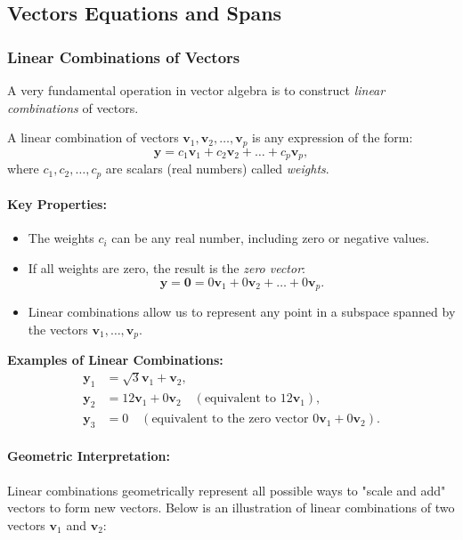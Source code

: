 \documentclass[a4paper,12pt]{article}
\begin{document}
\subsection{Vectors Equations and Spans}


\subsubsection{Linear Combinations of Vectors}

A very fundamental operation in vector algebra is to construct \textit{linear combinations} of vectors. 
\begin{tcolorbox}[title=Definition,colframe=blue!70!black, colback=blue!5!white]
A linear combination of vectors \(\mathbf{v}_1, \mathbf{v}_2, \dots, \mathbf{v}_p\) is any expression of the form:
\[
\mathbf{y} = c_1 \mathbf{v}_1 + c_2 \mathbf{v}_2 + \dots + c_p \mathbf{v}_p,
\]
where \(c_1, c_2, \dots, c_p\) are scalars (real numbers) called \textit{weights}.\\
\end{tcolorbox}
\paragraph{Key Properties:}
\begin{itemize}
    \item The weights \(c_i\) can be any real number, including zero or negative values.
    \item If all weights are zero, the result is the \textit{zero vector}: 
    \[
    \mathbf{y} = \mathbf{0} = 0 \mathbf{v}_1 + 0 \mathbf{v}_2 + \dots + 0 \mathbf{v}_p.
    \]
    \item Linear combinations allow us to represent any point in a subspace spanned by the vectors \(\mathbf{v}_1, \dots, \mathbf{v}_p\).
\end{itemize}

\textbf{Examples of Linear Combinations:}
\begin{align*}
\mathbf{y}_1 &= \sqrt{3} \mathbf{v}_1 + \mathbf{v}_2, \\
\mathbf{y}_2 &= 12 \mathbf{v}_1 + 0 \mathbf{v}_2 \quad (\text{equivalent to } 12\mathbf{v}_1), \\
\mathbf{y}_3 &= 0 \quad (\text{equivalent to the zero vector } 0\mathbf{v}_1 + 0\mathbf{v}_2).
\end{align*}

\paragraph{Geometric Interpretation:} Linear combinations geometrically represent all possible ways to "scale and add" vectors to form new vectors. Below is an illustration of linear combinations of two vectors \(\mathbf{v}_1\) and \(\mathbf{v}_2\):
\end{document}
